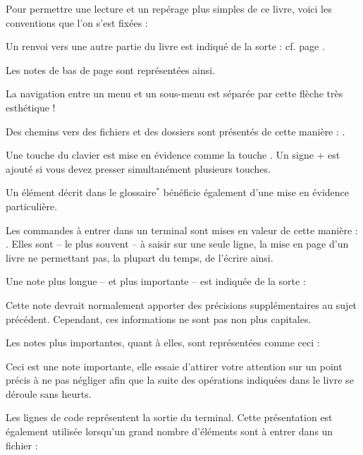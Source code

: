 \label{RefExemple}
Pour permettre une lecture et un repérage plus simples de ce livre, voici les conventions que l'on s'est fixées :\par
Un renvoi vers une autre partie du livre est indiqué de la sorte : cf. page \pageref{RefExemple}.\par
Les notes de bas de page sont représentées ainsi.\par
La navigation entre un menu et un sous-menu est séparée par cette flèche \FlecheDroite très esthétique !\par
Des chemins vers des fichiers et des dossiers sont présentés de cette manière : .\par
Une touche du clavier est mise en évidence comme la touche . Un signe + est ajouté si vous devez presser simultanément plusieurs touches.\par
Un élément décrit dans le glossaire$^*$ bénéficie également d'une mise en évidence particulière.\par
Les commandes à entrer dans un terminal sont mises en valeur de cette manière : . Elles sont -- le plus souvent -- à saisir sur une seule ligne, la mise en page d'un livre ne permettant pas, la plupart du temps, de l'écrire ainsi.\par
Une note plus longue -- et plus importante -- est indiquée de la sorte : \begin{nota}Cette note devrait normalement apporter des précisions supplémentaires au sujet précédent. Cependant, ces informations ne sont pas non plus capitales.\end{nota}\par
Les notes plus importantes, quant à elles, sont représentées comme ceci : \begin{attention}Ceci est une note importante, elle essaie d'attirer votre attention sur un point précis à ne pas négliger afin que la suite des opérations indiquées dans le livre se déroule sans heurts.\end{attention}\par
Les lignes de code représentent la sortie du terminal. Cette présentation est également utilisée lorsqu'un grand nombre d'éléments sont à entrer dans un fichier : \par
